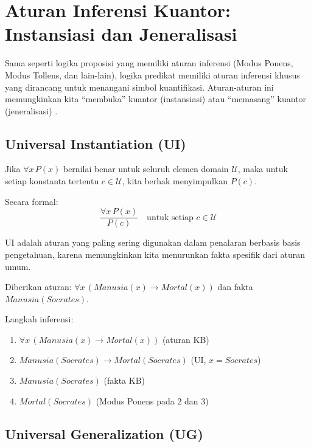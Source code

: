 \section{Aturan Inferensi Kuantor: Instansiasi dan Jeneralisasi}

Sama seperti logika proposisi yang memiliki aturan inferensi (Modus Ponens, Modus Tollens, dan lain-lain), logika predikat memiliki aturan inferensi khusus yang dirancang untuk menangani simbol kuantifikasi. Aturan-aturan ini memungkinkan kita ``membuka'' kuantor (instansiasi) atau ``memasang'' kuantor (jeneralisasi) \cite{rosen2019}.

\subsection{Universal Instantiation (UI)}

\begin{definisi}
Jika $\forall x\, P(x)$ bernilai benar untuk seluruh elemen domain $\mathcal{U}$, maka untuk setiap konstanta tertentu $c \in \mathcal{U}$, kita berhak menyimpulkan $P(c)$.

Secara formal:
\[ \frac{\forall x\, P(x)}{P(c)} \quad \text{untuk setiap } c \in \mathcal{U} \]
\end{definisi}

UI adalah aturan yang paling sering digunakan dalam penalaran berbasis basis pengetahuan, karena memungkinkan kita menurunkan fakta spesifik dari aturan umum.

\begin{contoh}
Diberikan aturan: $\forall x\, (Manusia(x) \rightarrow Mortal(x))$ dan fakta $Manusia(Socrates)$.

Langkah inferensi:
\begin{enumerate}
    \item $\forall x\, (Manusia(x) \rightarrow Mortal(x))$ \hfill (aturan KB)
    \item $Manusia(Socrates) \rightarrow Mortal(Socrates)$ \hfill (UI, $x = Socrates$)
    \item $Manusia(Socrates)$ \hfill (fakta KB)
    \item $Mortal(Socrates)$ \hfill (Modus Ponens pada 2 dan 3)
\end{enumerate}
\end{contoh}

\subsection{Universal Generalization (UG)}

